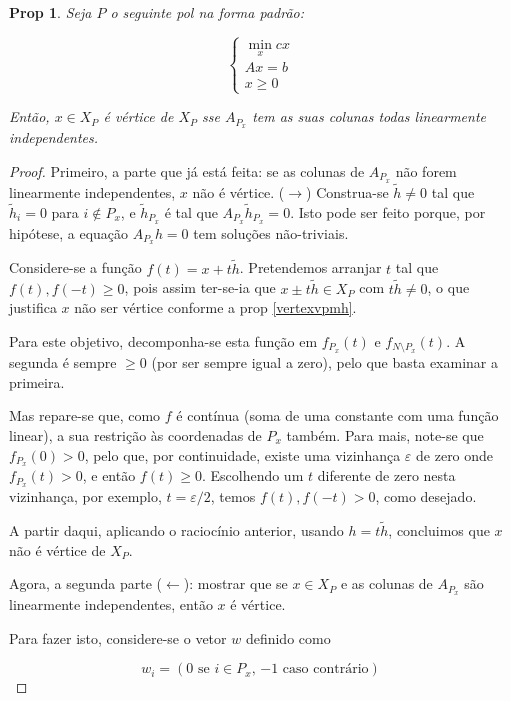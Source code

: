 \documentclass{article}
\newtheorem{prop}{Prop}
\theoremstyle{definition}
\begin{document}
	\begin{prop}
	Seja $P$ o seguinte pol na forma padrão:
	
	\[
	\begin{cases}
	\min\limits_x cx\\
	Ax = b\\
	x \geq 0
	\end{cases}
	\]
	
	Então, $x \in X_P$ é vértice de $X_P$ sse $A_{P_x}$ tem as suas colunas todas linearmente independentes.
	\end{prop}
	
	\begin{proof}
	Primeiro, a parte que já está feita: se as colunas de $A_{P_x}$ não forem linearmente independentes, $x$ não é vértice. ($\rightarrow$) Construa-se $\tilde h \neq 0$ tal que $\tilde h_i = 0$ para $i \not \in P_x$, e $\tilde h_{P_x}$ é tal que $A_{P_x} \tilde h_{P_x} = 0$. Isto pode ser feito porque, por hipótese, a equação $A_{P_x} h = 0$ tem soluções não-triviais.
	
	Considere-se a função $f(t) = x + t \tilde h$. Pretendemos arranjar $t$ tal que \allowbreak ${f(t), f(-t) \geq 0}$, pois assim ter-se-ia que $x \pm t \tilde h \in X_P$ com $t \tilde h \neq 0$, o que justifica $x$ não ser vértice conforme a prop \ref{vertexvpmh}.
	
	Para este objetivo, decomponha-se esta função em $f_{P_x}(t)$ e $f_{N \setminus P_x}(t)$. A segunda é sempre $\geq 0$ (por ser sempre igual a zero), pelo que basta examinar a primeira.
	
	Mas repare-se que, como $f$ é contínua (soma de uma constante com uma função linear), a sua restrição às coordenadas de $P_x$ também. Para mais, note-se que $f_{P_x}(0) > 0$, pelo que, por continuidade, existe uma vizinhança $\varepsilon$ de zero onde $f_{P_x}(t) > 0$, e então $f(t) \geq 0$. Escolhendo um $t$ diferente de zero nesta vizinhança, por exemplo, $t = \varepsilon/2$, temos $f(t), f(-t) > 0$, como desejado.
	
	A partir daqui, aplicando o raciocínio anterior, usando $h = t \tilde h$, concluimos que $x$ não é vértice de $X_P$.
	
	Agora, a segunda parte ($\leftarrow$): mostrar que se $x \in X_P$ e as colunas de $A_{P_x}$ são linearmente independentes, então $x$ é vértice.
	
	Para fazer isto, considere-se o vetor $w$ definido como
	
	\[w_i = (\text{$0$ se $i \in P_x$, $-1$ caso contrário})\]
	

\end{proof}
\end{document}
